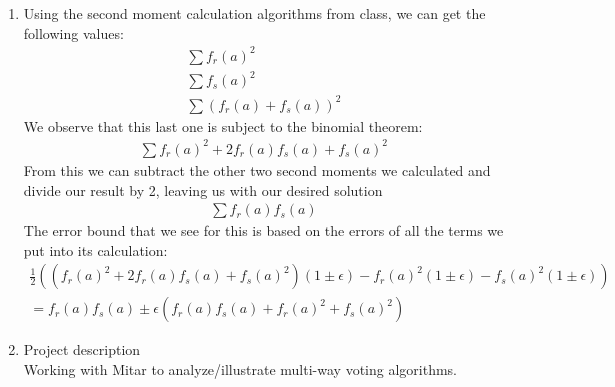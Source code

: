 \documentclass[a4paper]{article}
\begin{document}
\begin{enumerate}
\item Using the second moment calculation algorithms from class, we can get the following values:
	\begin{align}
		\sum{f_r(a)^2} \\	
		\sum{f_s(a)^2} \\
		\sum{(f_r(a)+f_s(a))^2}	
	\end{align}
	We observe that this last one is subject to the binomial theorem:
	\begin{align}
		\sum{f_r(a)^2 + 2f_r(a)f_s(a) + f_s(a)^2}
	\end{align}
	From this we can subtract the other two second moments we calculated and divide our result by 2, leaving us with our desired solution
	\begin{align}
		\sum{f_r(a)f_s(a)}
	\end{align}
	The error bound that we see for this is based on the errors of all the terms we put into its calculation:
	\begin{align}
		\frac{1}{2}((f_r(a)^2 + 2f_r(a)f_s(a) + f_s(a)^2)(1 \pm \epsilon) - f_r(a)^2(1 \pm \epsilon) - f_s(a)^2(1 \pm \epsilon)) \\
		= f_r(a)f_s(a) \pm \epsilon( f_r(a)f_s(a) + f_r(a)^2 + f_s(a)^2 )
	\end{align}
\item Project description \\
	Working with Mitar to analyze/illustrate multi-way voting algorithms.
\end{enumerate}
\end{document}
